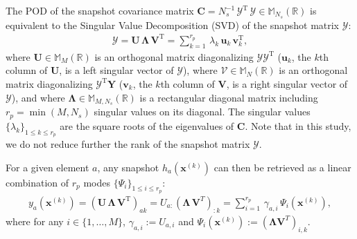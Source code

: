The POD of the snapshot covariance matrix $\mathbf{C} = N_{s}^{-1}\,\mathcal{Y}^{\mathrm{T}}\,\mathcal{Y}\in \mathbb{M}_{N_{s}}(\mathbb{R})$ is equivalent to the Singular Value Decomposition (SVD) of the snapshot matrix $\mathcal{Y}$:
\begin{align}
\mathcal{Y} = \mathbf{U}\,\mathbf{\Lambda}\,\mathbf{V}^{\mathrm{T}} = \displaystyle\sum_{k = 1}^{r_{p}}\,\lambda_k\,\mathbf{u}_k\,\mathbf{v}_k^{\mathrm{T}},
\end{align} 
where $\mathbf{U} \in \mathbb{M}_M(\mathbb{R})$ is an orthogonal matrix diagonalizing $\mathcal{Y}\mathcal{Y}^{\mathrm{T}}$ ($\mathbf{u}_k$, the $k$th column of $\mathbf{U}$, is a left singular vector of $\mathcal{Y}$), where $\mathcal{V} \in \mathbb{M}_N(\mathbb{R})$ is an orthogonal matrix diagonalizing $\mathcal{Y}^{\mathrm{T}}\mathbf{Y}$ ($\mathbf{v}_k$, the $k$th column of $\mathbf{V}$, is a right singular vector of $\mathcal{Y}$), and where $\mathbf{\Lambda} \in \mathbb{M}_{M,N_{s}}(\mathbb{R})$ is a rectangular diagonal matrix including $r_{p}=\min(M,N_{s})$ singular values on its diagonal. The singular values $\lbrace \lambda_k \rbrace_{1 \leq k \leq r_{p}}$ are the square roots of the eigenvalues of $\mathbf{C}$. 
Note that in this study, we do not reduce further the rank of the snapshot matrix $\mathcal{Y}$. %

For a given element $a$, any snapshot $h_a(\mathbf{x}^{(k)})$ can then be retrieved as a linear combination of $r_{p}$ modes $\{\Psi_i\}_{1\leq i \leq r_p}$:
\begin{align}\label{eq:gppod}
y_a(\mathbf{x}^{(k)}) 
= (\mathbf{U}\,\mathbf{\Lambda}\,\mathbf{V}^{\mathrm{T}})_{ak} 
= U_{a:}(\mathbf{\Lambda}\,\mathbf{V}^T)_{:k}=\sum_{i=1}^{r_{p}}\,\gamma_{a,i}\,\Psi_i(\mathbf{x}^{(k)}),
\end{align}
where for any $i\in\{1,\ldots,M\}$, $\gamma_{a,i}:=U_{a,i}$ and $\Psi_i(\mathbf{x}^{(k)}):=(\boldsymbol{\Lambda}\mathbf{V}^T)_{i,k}$. 
%


